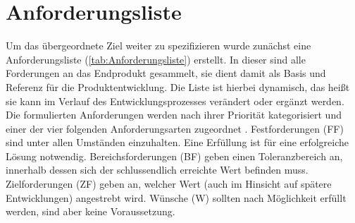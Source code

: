 \section{Anforderungsliste}
Um das übergeordnete Ziel weiter zu spezifizieren wurde zunächst eine Anforderungsliste (\autoref{tab:Anforderungsliste}) erstellt. In dieser sind alle Forderungen an das Endprodukt gesammelt, sie dient damit als Basis und Referenz für die Produktentwicklung. Die Liste ist hierbei dynamisch, das heißt sie kann im Verlauf des Entwicklungsprozesses verändert oder ergänzt werden.  Die formulierten Anforderungen werden nach ihrer Priorität kategorisiert und einer der vier folgenden Anforderungsarten zugeordnet \cite[S.189]{2013a}. Festforderungen (FF) sind unter allen Umständen einzuhalten. Eine Erfüllung ist für eine erfolgreiche Lösung notwendig.
Bereichsforderungen (BF) geben einen Toleranzbereich an, innerhalb dessen sich der schlussendlich erreichte Wert befinden muss.
Zielforderungen (ZF) geben an, welcher Wert (auch im Hinsicht auf spätere Entwicklungen) angestrebt wird.
Wünsche (W) sollten nach Möglichkeit erfüllt werden, sind aber keine Voraussetzung. 

